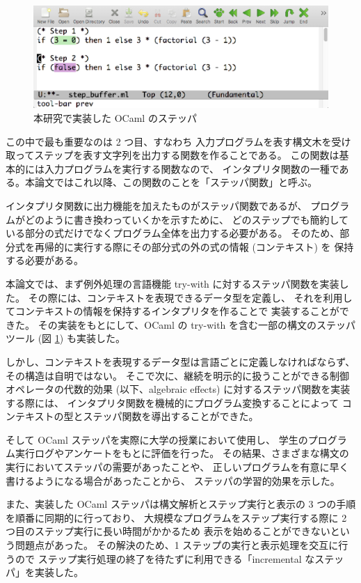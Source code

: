 \begin{figure}
\includegraphics[width=13cm]{1/ocamlfac.eps}
\caption{本研究で実装した OCaml のステッパ}
\label{figure:ocamlfac}
\end{figure}

この中で最も重要なのは 2 つ目、すなわち
入力プログラムを表す構文木を受け取ってステップを表す文字列を出力する関数を作ることである。
この関数は基本的には入力プログラムを実行する関数なので、
インタプリタ関数の一種である。本論文ではこれ以降、この関数のことを「ステッパ関数」と呼ぶ。

インタプリタ関数に出力機能を加えたものがステッパ関数であるが、
プログラムがどのように書き換わっていくかを示すために、
どのステップでも簡約している部分の式だけでなくプログラム全体を出力する必要がある。
そのため、部分式を再帰的に実行する際にその部分式の外の式の情報 (コンテキスト) を
保持する必要がある。

本論文では、まず例外処理の言語機能 try-with に対するステッパ関数を実装した。
その際には、コンテキストを表現できるデータ型を定義し、
それを利用してコンテキストの情報を保持するインタプリタを作ることで
実装することができた。
その実装をもとにして、OCaml の try-with を含む一部の構文のステッパツール
(図 \ref{figure:ocamlfac}) も実装した。

しかし、コンテキストを表現するデータ型は言語ごとに定義しなければならず、
その構造は自明ではない。
そこで次に、継続を明示的に扱うことができる制御オペレータの代数的効果 (以下、algebraic effects)
に対するステッパ関数を実装する際には、
インタプリタ関数を機械的にプログラム変換することによって
コンテキストの型とステッパ関数を導出することができた。

そして OCaml ステッパを実際に大学の授業において使用し、
学生のプログラム実行ログやアンケートをもとに評価を行った。
その結果、さまざまな構文の実行においてステッパの需要があったことや、
正しいプログラムを有意に早く書けるようになる場合があったことから、
ステッパの学習的効果を示した。

また、実装した OCaml ステッパは構文解析とステップ実行と表示の
3 つの手順を順番に同期的に行っており、
大規模なプログラムをステップ実行する際に 2 つ目のステップ実行に長い時間がかかるため
表示を始めることができないという問題点があった。
その解決のため、1 ステップの実行と表示処理を交互に行うので
ステップ実行処理の終了を待たずに利用できる「incremental なステッパ」を実装した。

